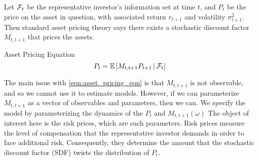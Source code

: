 \documentclass[11pt, letterpaper, twoside, final]{article}
\begin{document}
Let $\mathcal{F}_t$ be the representative investor's information set at time $t$, and $P_t$ be the price on the asset in question, with associated return $r_{t+1}$ and volatility $\sigma^2_{t+1}$. Then standard asset pricing theory says there exists a stochastic discount factor $M_{t,t+1}$ that prices the assets.  %





\begin{defn}{Asset Pricing Equation}\label{eqn:asset_pricing_eqn}
  \begin{equation}
    P_t = \operatorname{\mathbb{E}}\left[M_{t,t+1} P_{t+1} \,\middle\vert\, \mathcal{F}_t \right] 
  \end{equation}
\end{defn}

The main issue with \cref{eqn:asset_pricing_eqn} is that $M_{t,t+1}$ is not observable, and so we cannot use it to estimate models. However, if we can parameterize $M_{t,t+1}$ as a vector of observables and parameters, then we can.  We specify the model by parameterizing the dynamics of the $P_t$ and $M_{t, t+1}(\omega)$ The object of interest here is the risk prices, which are such parameters. Risk prices measure the level of compensation that the representative investor demands in order to face additional risk. Consequently, they determine the amount that the stochastic discount factor (SDF) twists the distribution of $P_t$. 
\end{document}
